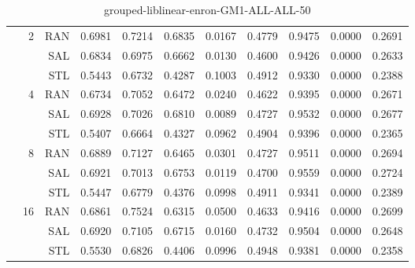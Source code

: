 \begin{center}
\begin{table}[htbp]
\begin{tabular}{ | r | r | r | r | r | r | r | r | r | r | r |}
 & \multirow{3}{*}{2} & RAN & 0.6981 & 0.7214 & 0.6835 & 0.0167 & 0.4779 & 0.9475 & 0.0000 & 0.2691\\ \cline{3-11}
 &   & SAL & 0.6834 & 0.6975 & 0.6662 & 0.0130 & 0.4600 & 0.9426 & 0.0000 & 0.2633\\ \cline{3-11}
 &   & STL & 0.5443 & 0.6732 & 0.4287 & 0.1003 & 0.4912 & 0.9330 & 0.0000 & 0.2388\\ \cline{2-11}
 & \multirow{3}{*}{4} & RAN & 0.6734 & 0.7052 & 0.6472 & 0.0240 & 0.4622 & 0.9395 & 0.0000 & 0.2671\\ \cline{3-11}
 &   & SAL & 0.6928 & 0.7026 & 0.6810 & 0.0089 & 0.4727 & 0.9532 & 0.0000 & 0.2677\\ \cline{3-11}
 &   & STL & 0.5407 & 0.6664 & 0.4327 & 0.0962 & 0.4904 & 0.9396 & 0.0000 & 0.2365\\ \cline{2-11}
 & \multirow{3}{*}{8} & RAN & 0.6889 & 0.7127 & 0.6465 & 0.0301 & 0.4727 & 0.9511 & 0.0000 & 0.2694\\ \cline{3-11}
 &   & SAL & 0.6921 & 0.7013 & 0.6753 & 0.0119 & 0.4700 & 0.9559 & 0.0000 & 0.2724\\ \cline{3-11}
 &   & STL & 0.5447 & 0.6779 & 0.4376 & 0.0998 & 0.4911 & 0.9341 & 0.0000 & 0.2389\\ \cline{2-11}
 & \multirow{3}{*}{16} & RAN & 0.6861 & 0.7524 & 0.6315 & 0.0500 & 0.4633 & 0.9416 & 0.0000 & 0.2699\\ \cline{3-11}
 &   & SAL & 0.6920 & 0.7105 & 0.6715 & 0.0160 & 0.4732 & 0.9504 & 0.0000 & 0.2648\\ \cline{3-11}
 &   & STL & 0.5530 & 0.6826 & 0.4406 & 0.0996 & 0.4948 & 0.9381 & 0.0000 & 0.2358\\ \cline{2-11}
\hline
\end{tabular}
\caption{grouped-liblinear-enron-GM1-ALL-ALL-50}
\end{table}
\end{center}

